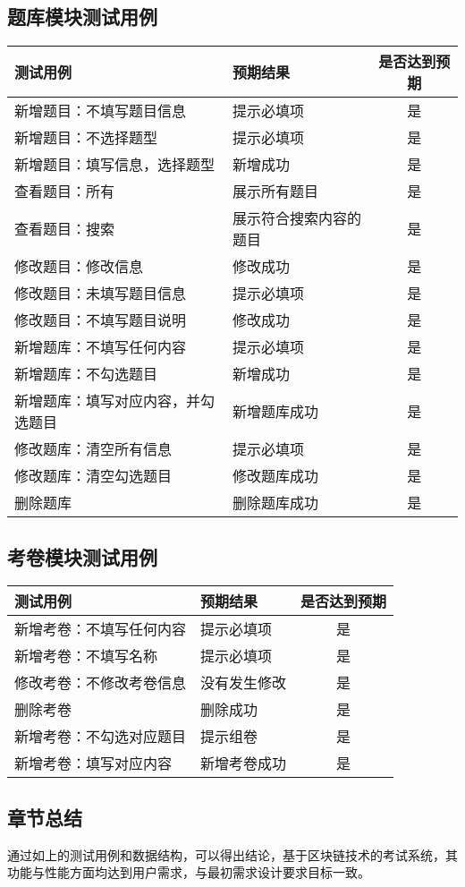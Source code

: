 \subsection{题库模块测试用例}
\begin{table}[h!]
\begin{tabularx}{\linewidth}{@{}Xlc@{}}
\toprule
测试用例           & 预期结果      & 是否达到预期 \\ \midrule
新增题目：不填写题目信息 & 提示必填项 & 是 \\
新增题目：不选择题型 & 提示必填项 & 是  \\
新增题目：填写信息，选择题型 & 新增成功 & 是 \\
查看题目：所有 & 展示所有题目 & 是 \\
查看题目：搜索 & 展示符合搜索内容的题目 & 是 \\
修改题目：修改信息 & 修改成功 & 是 \\
修改题目：未填写题目信息 & 提示必填项 & 是 \\
修改题目：不填写题目说明 & 修改成功 & 是  \\
新增题库：不填写任何内容   & 提示必填项 & 是      \\
新增题库：不勾选题目 & 新增成功 & 是      \\
新增题库：填写对应内容，并勾选题目    & 新增题库成功    & 是   \\ 
修改题库：清空所有信息  & 提示必填项      & 是      \\
修改题库：清空勾选题目  & 修改题库成功    & 是      \\
删除题库 & 删除题库成功 & 是  \\ \bottomrule
\end{tabularx}
\end{table}

\subsection{考卷模块测试用例}
\begin{table}[h!]
\begin{tabularx}{\linewidth}{@{}Xlc@{}}
\toprule
测试用例           & 预期结果      & 是否达到预期 \\ \midrule
新增考卷：不填写任何内容   & 提示必填项 & 是      \\
新增考卷：不填写名称 & 提示必填项 & 是      \\
修改考卷：不修改考卷信息  & 没有发生修改      & 是      \\
删除考卷  & 删除成功    & 是      \\
新增考卷：不勾选对应题目 & 提示组卷 & 是  \\
新增考卷：填写对应内容    & 新增考卷成功    & 是   \\ \bottomrule
\end{tabularx}
\end{table}


\subsection{章节总结}
通过如上的测试用例和数据结构，可以得出结论，基于区块链技术的考试系统，其功能与性能方面均达到用户需求，与最初需求设计要求目标一致。